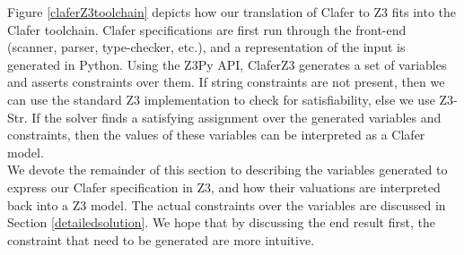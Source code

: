 \documentclass{easychair}
\begin{document}
\indent Figure \ref{claferZ3toolchain} depicts how our translation of Clafer to Z3 fits into the Clafer toolchain. Clafer specifications are first run through the front-end (scanner, parser, type-checker, etc.), and a representation of the input is generated in Python. Using the Z3Py API, ClaferZ3 generates a set of variables and asserts constraints over them. If string constraints are not present, then we can use the standard Z3 implementation to check for satisfiability, else we use Z3-Str.  If the solver finds a satisfying assignment over the generated variables and constraints, then the values of these variables can be interpreted as a Clafer model. \\
\indent We devote the remainder of this section to describing the variables generated to express our Clafer specification in Z3, and how their valuations are interpreted back into a Z3 model. The actual constraints over the variables are discussed in Section \ref{detailedsolution}. We hope that by discussing the end result first, the constraint that need to be generated are more intuitive.
\end{document}
